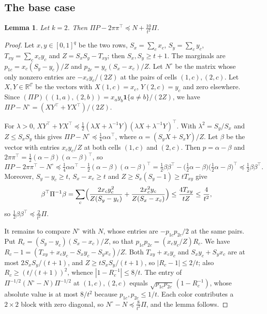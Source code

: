\documentclass{amsart}
\numberwithin{equation}{section}
\theoremstyle{plain}
\newtheorem{lemma}[theorem]{Lemma}
\theoremstyle{definition}
\theoremstyle{remark}
\newcommand{\R}{\mathbb{R}}
\newcommand{\cC}{\mathcal{C}}
\newcommand{\T}{\top}
\newcommand{\one}{\mathbf{1}}
\begin{document}
\subsection{The base case}

\begin{lemma}\label{lem:base}
Let $k=2$. Then $\Pi P-2\pi\pi^\T\preceq N+\frac{10}{t^2}\Pi$.
\end{lemma}

\begin{proof}
Let $x,y\in[0,1]^q$ be the two rows, $S_x=\sum_cx_c$, $S_y=\sum_cy_c$, $T_{xy}=\sum_cx_cy_c$ and $Z=S_xS_y-T_{xy}$; then $S_x,S_y\ge t+1$. The marginals are $p_{1c}=x_c(S_y-y_c)/Z$ and $p_{2c}=y_c(S_x-x_c)/Z$. Let $N^\circ$ be the matrix whose only nonzero entries are $-x_cy_c/(2Z)$ at the pairs of cells $(1,c),(2,c)$. Let $X,Y\in\R^{\cC}$ be the vectors with $X(1,c)=x_c$, $Y(2,c)=y_c$ and zero elsewhere. Since $(\Pi P)((1,a),(2,b))=x_ay_b\one\{a\ne b\}/(2Z)$, we have $\Pi P-N^\circ=(XY^\T+YX^\T)/(2Z)$.

For $\lambda>0$, $XY^\T+YX^\T\preceq\frac12(\lambda X+\lambda^{-1}Y)(\lambda X+\lambda^{-1}Y)^\T$. With $\lambda^2=S_y/S_x$ and $Z\le S_xS_y$ this gives $\Pi P-N^\circ\preceq\frac14\alpha\alpha^\T$, where $\alpha=(S_yX+S_xY)/Z$. Let $\beta$ be the vector with entries $x_cy_c/Z$ at both cells $(1,c)$ and $(2,c)$. Then $p=\alpha-\beta$ and $2\pi\pi^\T=\frac12(\alpha-\beta)(\alpha-\beta)^\T$, so
\[
\Pi P-2\pi\pi^\T-N^\circ\preceq\tfrac14\alpha\alpha^\T-\tfrac12(\alpha-\beta)(\alpha-\beta)^\T=\tfrac12\beta\beta^\T-\bigl(\tfrac12\alpha-\beta\bigr)\bigl(\tfrac12\alpha-\beta\bigr)^\T\preceq\tfrac12\beta\beta^\T .
\]
Moreover, $S_y-y_c\ge t$, $S_x-x_c\ge t$ and $Z\ge S_x(S_y-1)\ge tT_{xy}$ give
\[
\beta^\T\Pi^{-1}\beta=\sum_c\Bigl(\frac{2x_cy_c^2}{Z(S_y-y_c)}+\frac{2x_c^2y_c}{Z(S_x-x_c)}\Bigr)\le\frac{4T_{xy}}{tZ}\le\frac{4}{t^2},
\]
so $\frac12\beta\beta^\T\preceq\frac2{t^2}\Pi$.

It remains to compare $N^\circ$ with $N$, whose entries are $-p_{1c}p_{2c}/2$ at the same pairs. Put $R_c=(S_y-y_c)(S_x-x_c)/Z$, so that $p_{1c}p_{2c}=(x_cy_c/Z)R_c$. We have $R_c-1=(T_{xy}+x_cy_c-S_xy_c-S_yx_c)/Z$. Both $T_{xy}+x_cy_c$ and $S_xy_c+S_yx_c$ are at most $2S_xS_y/(t+1)$, and $Z\ge tS_xS_y/(t+1)$, so $|R_c-1|\le2/t$; also $R_c\ge(t/(t+1))^2$, whence $|1-R_c^{-1}|\le8/t$. The entry of $\Pi^{-1/2}(N^\circ-N)\Pi^{-1/2}$ at $(1,c),(2,c)$ equals $\sqrt{p_{1c}p_{2c}}\,(1-R_c^{-1})$, whose absolute value is at most $8/t^2$ because $p_{1c},p_{2c}\le1/t$. Each color contributes a $2\times2$ block with zero diagonal, so $N^\circ-N\preceq\frac8{t^2}\Pi$, and the lemma follows.
\end{proof}
\end{document}
